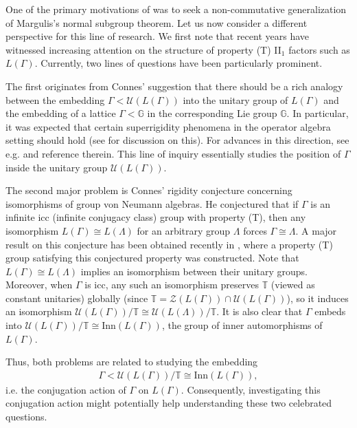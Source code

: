 \documentclass[12pt]{amsart}
\theoremstyle{definition}
\theoremstyle{remark}
\begin{document}
One of the primary motivations of  \cites{ab,kp} was to seek a non-commutative generalization of Margulis's normal subgroup theorem. Let us now consider a different perspective for this line of research. We first note that recent years have witnessed increasing attention on the structure of property (T) II$_1$ factors such as $L(\Gamma)$. Currently, two lines of questions have been particularly prominent.

The first originates from Connes’ suggestion that there should be a rich analogy between the embedding $\Gamma<\mathcal{U}(L(\Gamma))$ into the unitary group of $L(\Gamma)$ and the embedding of a lattice $\Gamma<\mathbb{G}$  in the corresponding Lie group $\mathbb{G}$. In particular, it was expected that certain superrigidity phenomena in the operator algebra setting should hold (see \cites{jones_10,cp,peterson_online} for discussion on this). For advances in this direction, see e.g. \cites{bekka_invent, pt,cp,bh,bbhp,dp, dgghl} and reference therein. This line of inquiry essentially studies the position of $\Gamma$ inside the unitary group $\mathcal{U}(L(\Gamma))$.



The second major problem is Connes’ rigidity conjecture concerning isomorphisms of group von Neumann algebras. He conjectured that if $\Gamma$ is an infinite icc  (infinite conjugacy class) group with property (T), then any isomorphism $L(\Gamma)\cong L(\Lambda)$ for an arbitrary group $\Lambda$ forces $\Gamma\cong \Lambda$. A major result on this conjecture has been obtained recently in \cites{ cios}, where a property (T) group satisfying this conjectured property was constructed. Note that $L(\Gamma)\cong L(\Lambda)$ implies an isomorphism between their unitary groups. Moreover, when $\Gamma$ is icc, any such an isomorphism preserves $\mathbb{T}$ (viewed as constant unitaries) globally (since $\mathbb{T}=\mathcal{Z}(L(\Gamma))\cap \mathcal{U}(L(\Gamma))$), so it induces an isomorphism $\mathcal{U}(L(\Gamma))/\mathbb{T}\cong \mathcal{U}(L(\Lambda))/\mathbb{T}$. It is also clear that $\Gamma$ embeds into $\mathcal{U}(L(\Gamma))/\mathbb{T}\cong \text{Inn}(L(\Gamma))$, the group of inner automorphisms of $L(\Gamma)$.

Thus, both problems are related to studying the embedding
\begin{align*}
    \Gamma<\mathcal{U}(L(\Gamma))/\mathbb{T}\cong \text{Inn}(L(\Gamma)),
\end{align*}
i.e. the conjugation action of $\Gamma$ on $L(\Gamma)$. Consequently, investigating this conjugation action might  potentially help understanding these two celebrated questions. 
\end{document}
